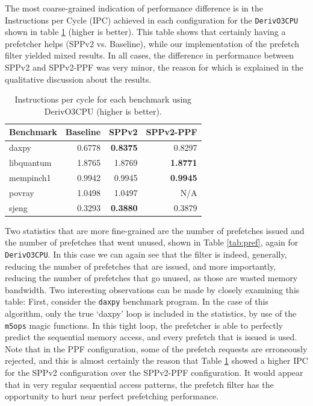 \documentclass[10pt,conference]{IEEEtran}
\begin{document}
The most coarse-grained indication of performance difference is in the Instructions per Cycle (IPC) achieved in each configuration for the \texttt{DerivO3CPU} shown in table \ref{tab:ipc} (higher is better). This  table shows that certainly having a prefetcher helps (SPPv2 vs. Baseline), while our implementation of the prefetch filter yielded mixed results. In all cases, the difference in performance between SPPv2 and SPPv2-PPF was very minor, the reason for which is explained in the qualitative discussion about the results.
\begin{table}[ht]
\caption{Instructions per cycle for each benchmark using DerivO3CPU (higher is better).}
\centering
\begin{tabular}{l|rrr}
Benchmark &  Baseline &     SPPv2 &  SPPv2-PPF \\
\hline
daxpy      &  0.6778 &  \textbf{0.8375} &   0.8297 \\
libquantum &  1.8765 &  1.8769 &   \textbf{1.8771} \\
mempinch1  &  0.9942 &  0.9945 &   \textbf{0.9945} \\
povray     &  1.0498 &  1.0497 &        N/A \\
sjeng      &  0.3293 &  \textbf{0.3880} &   0.3879 \\
\end{tabular}
\label{tab:ipc}
\end{table}

Two statistics that are more fine-grained are the number of prefetches issued and the number of prefetches that went unused, shown in Table \ref{tab:pref}, again for \texttt{DerivO3CPU}. In this case we can again see that the filter is indeed, generally, reducing the number of prefetches that are issued, and more importantly, reducing the number of prefetches that go unused, as those are wasted memory bandwidth.  Two interesting observations can be made by closely examining this table: First, consider the \texttt{daxpy} benchmark program. In the case of this algorithm, only the true `daxpy' loop is included in the statistics, by use of the \texttt{m5ops} magic functions. In this tight loop, the prefetcher is able to perfectly predict the sequential memory access, and every prefetch that is issued is used. Note that in the PPF configuration, some of the prefetch requests are erroneously rejected, and this is almost certainly the reason that Table \ref{tab:ipc} showed a higher IPC for the SPPv2 configuration over the SPPv2-PPF configuration. It would appear that in very regular sequential access patterns, the prefetch filter has the opportunity to hurt near perfect prefetching performance.
\end{document}
